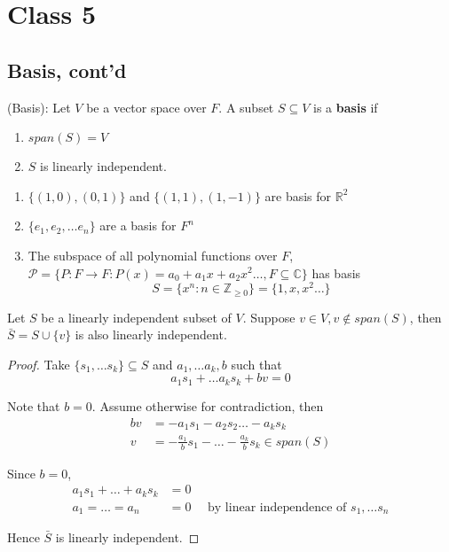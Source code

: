 \section{Class 5}

\subsection{Basis, cont'd}

\begin{definition}
(Basis): Let $V$ be a vector space over $F$. A subset $S \subseteq V$ is a \textbf{basis} if 
    \begin{enumerate}
        \item $span(S) = V$
        \item $S$ is linearly independent.
    \end{enumerate}
\end{definition} 

\begin{example}
\begin{enumerate}
    \item $ \{ (1, 0), (0, 1) \} $ and $\{ (1, 1), (1, -1) \} $ are basis for $\mathbb{R}^2$
    \item $ \{ e_1, e_2, \hdots e_n \} $ are a basis for $F^n$
    \item The subspace of all polynomial functions over $F$, $\mathcal{P} = \{ P: F \to F: P(x) = a_0 + a_1 x + a_2 x^2 \hdots, F \subseteq \mathbb{C} \} $ has basis 
    \[
      S = \{ x^n : n \in \mathbb{Z}_{\geq 0} \}  = \{ 1, x, x^2 \hdots \} 
    \]
\end{enumerate}
\end{example}

\begin{lemma}
Let $S$ be a linearly independent subset of $V$. Suppose $v \in V, v \notin span(S)$, then $\bar{S} = S \cup \{ v \} $ is also linearly independent.
\end{lemma} 

\begin{proof}
Take $\{ s_1, \hdots s_k \} \subseteq S $ and $a_1, \hdots a_k, b$ such that 
\[
  a_1 s_1 + \hdots a_k s_k + bv = 0
\]

Note that $b = 0$. Assume otherwise for contradiction, then 
\begin{align*}
    bv &= -a_1 s_1 -a_2 s_2 \hdots -a_k s_k \\
    v &= - \frac{a_1}{b} s_1 - \hdots - \frac{a_k}{b} s_k \in span(S)
\end{align*}

Since $b = 0$, 
\begin{align*}
    a_1 s_1 + \hdots + a_k s_k &= 0 \\
    a_1 = \hdots = a_n &= 0 \quad \text{ by linear independence of } s_1, \hdots s_n
\end{align*}

Hence $ \bar{S}$ is linearly independent.

\end{proof}


